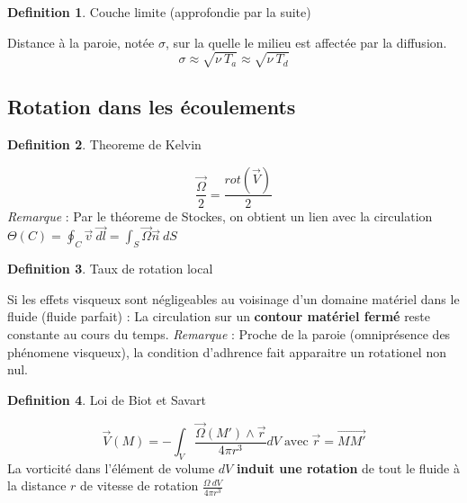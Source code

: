 \documentclass[french]{article}
\theoremstyle{definition}
\newtheorem{definition}{Definition}[section]
\begin{document}
\begin{definition} Couche limite (approfondie par la suite) \par
	Distance à la paroie, notée $\sigma$, sur la quelle le milieu est affectée par la diffusion. 
	$$ \sigma \approx \sqrt{\nu \ T_a } \approx \sqrt{\nu \ T_d }$$ 
\end{definition}


\subsection{Rotation dans les écoulements}

\begin{definition} Theoreme de Kelvin \par
	$$ \frac{\vec{\Omega}}{2} = \frac{rot(\vec{V})}{2} $$
	\textit{Remarque} : Par le théoreme de Stockes, on obtient un lien avec la circulation
	$ \Theta(C) = \oint_C \vec{v} \ \vec{dl} = \int_S \vec{\Omega} \vec{n} \ dS$
\end{definition}


\begin{definition} Taux de rotation local \par
	Si les effets visqueux sont négligeables au voisinage d'un domaine matériel dans le fluide (fluide parfait) :
	La circulation sur un \textbf{contour matériel fermé} reste constante au cours du temps.
	\textit{Remarque} : Proche de la paroie (omniprésence des phénomene visqueux), la condition d'adhrence fait apparaitre un rotationel non nul.
\end{definition}

\begin{definition} Loi de Biot et Savart \par
	$$ \vec{V}(M) = - \int_V \frac{\vec{\Omega}(M') \wedge \vec{r}}{4 \pi r^3} dV \; \mbox{avec} \; \vec{r} = \vec{MM'} $$
	La vorticité dans l'élément de volume $dV$ \textbf{induit une rotation} de tout le fluide à la distance $r$ de vitesse de rotation $ \frac{\Omega \ dV}{4\pi r^3}$
\end{definition}
\end{document}
